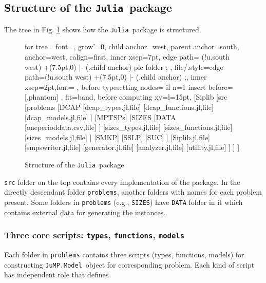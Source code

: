 \documentclass{hitec}
\newcommand{\julia}{\texttt{Julia}}
\newcommand{\jumpmodel}{\texttt{JuMP.Model}}
\begin{document}
	\subsection{Structure of the \julia\ package}
	The tree in Fig. \ref{fig:siplibjl_structure} shows how the \julia\ package is structured. 
	\begin{figure}[H] 
		\centering   
		\begin{forest}
			for tree={
				font=\ttfamily,
				grow'=0,
				child anchor=west,
				parent anchor=south,
				anchor=west,
				calign=first,
				inner xsep=7pt,
				edge path={
					\noexpand{}
					(!u.south west) +(7.5pt,0) |- (.child anchor) pic {folder} ;
				},
				file/.style={edge path={\noexpand{}
						(!u.south west) +(7.5pt,0) |- (.child anchor) ;},
					inner xsep=2pt,font=\small\ttfamily
				},
				before typesetting nodes={
					if n=1
					{insert before={[,phantom]}}
					{}
				},
				fit=band,
				before computing xy={l=15pt},
			}  
			[Siplib
			[src
			[problems
			[DCAP
			[dcap\_types.jl,file]
			[dcap\_functions.jl,file]
			[dcap\_models.jl,file]
			]
			[MPTSPs]
			[SIZES
			[DATA
			[oneperioddata.csv,file]
			]
			[sizes\_types.jl,file]
			[sizes\_functions.jl,file]
			[sizes\_models.jl,file]			
			]
			[SMKP]
			[SSLP]
			[SUC]
			]
			[Siplib.jl,file]
			[smpswriter.jl,file]
			[generator.jl,file]
			[analyzer.jl,file]
			[utility.jl,file]
			]
			]
			]
		\end{forest}
		\caption{Structure of the \julia\ package}\label{fig:siplibjl_structure}
	\end{figure}
	
	\texttt{src} folder on the top contains every implementation of the package. In the directly descendant folder \texttt{problems}, another folders with names for each problem present. Some folders in \texttt{problems} (e.g., \texttt{SIZES}) have \texttt{DATA} folder in it which contains external data for generating the instances.
	
	\subsubsection{Three core scripts: \texttt{types}, \texttt{functions}, \texttt{models}}
	Each folder in \texttt{problems} contains three scripts (types, functions, models) for constructing \jumpmodel\ object for corresponding problem. Each kind of script has independent role that defines 
	
\end{document}
